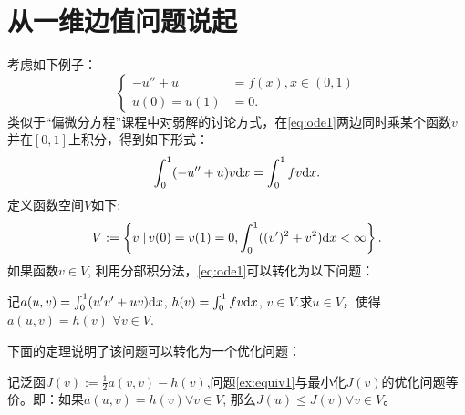 \section{从一维边值问题说起}
考虑如下例子：
\begin{equation}
  \label{eq:ode1}
  \left\{
    \begin{aligned}
    -u''+u&=f(x),x\in(0,1)\\
    u(0)=u(1)&=0.
    \end{aligned}
  \right.
\end{equation}
类似于“偏微分方程”课程中对弱解的讨论方式，在\eqref{eq:ode1}两边同时乘某个函数$v$并在$[0,1]$上积分，得到如下形式：
\begin{equation}
  \label{eq:bianfen}
  \int_{0}^{1}(-u''+u)v\mathrm{d} x=\int_{0}^{1}fv\mathrm{d} x.
\end{equation}
定义函数空间$V$如下:
\begin{equation}
  \label{eq:sobolev1-1}
  V:=\left\{v\left.\right|v(0)=v(1)=0,\int_{0}^{1}((v')^{2}+v^{2})\mathrm{d} x<\infty\right\}.
\end{equation}
如果函数$v\in V$, 利用分部积分法，\eqref{eq:ode1}可以转化为以下问题：
\begin{example}
  \label{ex:equiv1}
  记$a(u,v)=\int_{0}^{1}(u'v'+uv)\mathrm{d} x$, $h(v)=\int_{0}^{1}fv\mathrm{d} x$, $v\in V$.求$u\in V$，使得$a(u,v)=h(v)$ $\forall v\in V$.
\end{example}
下面的定理说明了该问题可以转化为一个优化问题：
\begin{theorem}{}{}
  \label{thm:bianfen}
  记泛函$J(v):=\frac{1}{2}a(v,v)-h(v)$,问题\ref{ex:equiv1}与最小化$J(v)$的优化问题等价。即：如果$a(u,v)=h(v)\forall v\in V$, 那么$J(u)\le J(v)\forall v\in V$。
\end{theorem}
